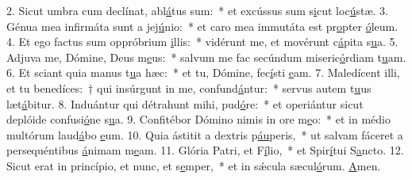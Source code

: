 2. Sicut umbra cum declínat, abl\uline{á}tus sum:~* et excússus sum s\uline{i}cut loc\uline{ú}stæ.
3. Génua mea infirmáta sunt a jej\uline{ú}nio:~* et caro mea immutáta est pr\uline{o}pter \uline{ó}leum.
4. Et ego factus sum oppróbrium \uline{i}llis:~* vidérunt me, et movérunt c\uline{á}pita s\uline{u}a.
5. Adjuva me, Dómine, Deus m\uline{e}us:~* salvum me fac secúndum miseric\uline{ó}rdiam t\uline{u}am.
6. Et sciant quia manus t\uline{u}a hæc:~* et tu, Dómine, fec\uline{í}sti \uline{e}am.
7. Maledícent illi, et tu benedíces:~† qui insúrgunt in me, confund\uline{á}ntur:~* servus autem t\uline{u}us læt\uline{á}bitur.
8. Induántur qui détrahunt mihi, pud\uline{ó}re:~* et operiántur sicut deplóide confusi\uline{ó}ne s\uline{u}a.
9. Confitébor Dómino nimis in ore m\uline{e}o:~* et in médio multórum laud\uline{á}bo \uline{e}um.
10. Quia ástitit a dextris p\uline{áu}peris,~* ut salvam fáceret a persequéntibus \uline{á}nimam m\uline{e}am.
11. Glória Patri, et F\uline{í}lio,~* et Spir\uline{í}tui S\uline{a}ncto.
12. Sicut erat in princípio, et nunc, et s\uline{e}mper,~* et in sǽcula sæcul\uline{ó}rum. \uline{A}men.
